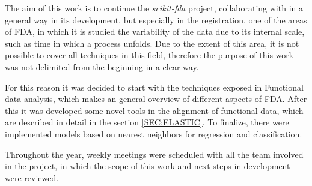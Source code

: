 The aim of this work is to continue the \textit{scikit-fda} project,
collaborating with in a general way in its development, but especially in the
registration, one of the areas of FDA, in which it is studied the
variability of the data due to its internal scale, such as time
in which a process unfolds. Due to the extent of this area, it is not possible
to cover all techniques in this field, therefore the purpose of this work was
not delimited from the beginning in a clear way.

For this reason it was decided to start with the techniques
exposed in Functional data analysis\cite{Ramsay2005}, which makes an general overview of different
aspects of FDA. After this it was developed some
novel tools in the alignment of functional data, which are described in detail in the
section \ref{SEC:ELASTIC}. To finalize, there were implemented models based on
nearest neighbors for regression and classification.

Throughout the year, weekly meetings were scheduled with all the team involved
in the project, in which the scope of this work
and next steps in development were reviewed.
